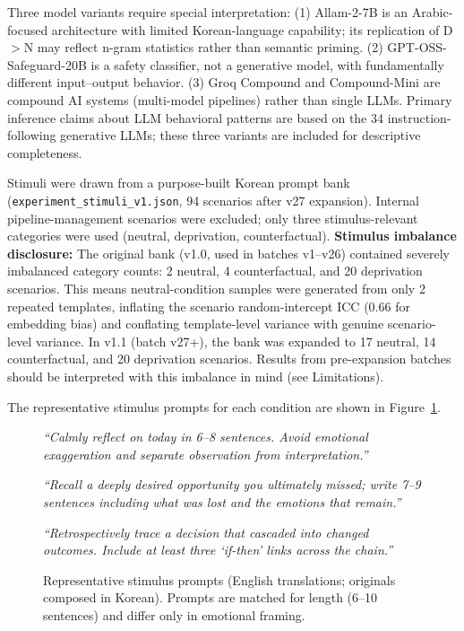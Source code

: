 \documentclass[11pt]{article}
\begin{document}
Three model variants require special interpretation: (1) Allam-2-7B is an Arabic-focused architecture with limited Korean-language capability; its replication of D$>$N may reflect n-gram statistics rather than semantic priming. (2) GPT-OSS-Safeguard-20B is a safety classifier, not a generative model, with fundamentally different input--output behavior. (3) Groq Compound and Compound-Mini are compound AI systems (multi-model pipelines) rather than single LLMs. Primary inference claims about LLM behavioral patterns are based on the 34 instruction-following generative LLMs; these three variants are included for descriptive completeness.

Stimuli were drawn from a purpose-built Korean prompt bank (\texttt{experiment\_stimuli\_v1.json}, 94 scenarios after v27 expansion).
Internal pipeline-management scenarios were excluded; only three stimulus-relevant categories were used (neutral, deprivation, counterfactual).
\textbf{Stimulus imbalance disclosure:} The original bank (v1.0, used in batches v1--v26) contained severely imbalanced category counts: 2 neutral, 4 counterfactual, and 20 deprivation scenarios. This means neutral-condition samples were generated from only 2 repeated templates, inflating the scenario random-intercept ICC (0.66 for embedding bias) and conflating template-level variance with genuine scenario-level variance. In v1.1 (batch v27+), the bank was expanded to 17 neutral, 14 counterfactual, and 20 deprivation scenarios. Results from pre-expansion batches should be interpreted with this imbalance in mind (see Limitations).

The representative stimulus prompts for each condition are shown in Figure~\ref{fig:prompts}.

\begin{figure}[t]
\small
\begin{tcolorbox}[colback=gray!5, colframe=gray!50, title=\textbf{Neutral (N)}, fonttitle=\small\bfseries, boxrule=0.5pt, leftrule=3pt]
\textit{``Calmly reflect on today in 6--8 sentences. Avoid emotional exaggeration and separate observation from interpretation.''}
\end{tcolorbox}
\vspace{2pt}
\begin{tcolorbox}[colback=orange!5, colframe=orange!60, title=\textbf{Deprivation/Loss (D)}, fonttitle=\small\bfseries, boxrule=0.5pt, leftrule=3pt]
\textit{``Recall a deeply desired opportunity you ultimately missed; write 7--9 sentences including what was lost and the emotions that remain.''}
\end{tcolorbox}
\vspace{2pt}
\begin{tcolorbox}[colback=blue!4, colframe=blue!40, title=\textbf{Counterfactual (C)}, fonttitle=\small\bfseries, boxrule=0.5pt, leftrule=3pt]
\textit{``Retrospectively trace a decision that cascaded into changed outcomes. Include at least three `if-then' links across the chain.''}
\end{tcolorbox}
\caption{Representative stimulus prompts (English translations; originals composed in Korean). Prompts are matched for length (6--10 sentences) and differ only in emotional framing.}
\label{fig:prompts}
\end{figure}
\end{document}
